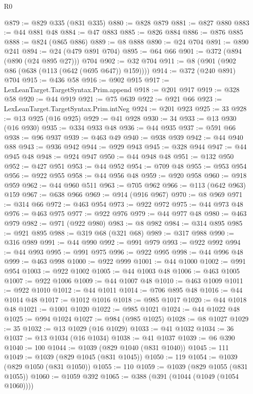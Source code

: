 \begin{lexlean}{R0}
\begin{coremodule}
@879 := @829 @335 (@831 @335)
@880 := @828 @879
@881 := @827 @880
@883 := @44 @881 @48
@884 := @47 @883
@885 := @826 @884
@886 := @876 @885
@888 := @824 (@865 @886)
@889 := @8 @888
@890 := @24 @704
@891 := @890 @241
@894 := @24 (@479 @891 @704)
@895 := @64 @66
@901 := @372 (@894 (@890 (@24 @895 @27))) @704
@902 := @32 @704
@911 := @8 (@901 (@902 @86 (@638 (@113 (@642 (@695 @647)) @159))))
@914 := @372 (@240 @891) @704
@915 := @436 @58
@916 := @902 @915
@917 := LexLeanTarget.TargetSyntax.Prim.append
@918 := @201 @917
@919 := @328 @58
@920 := @44 @919
@921 := @75 @639
@922 := @921 @66
@923 := LexLeanTarget.TargetSyntax.Prim.intNeg
@924 := @201 @923
@925 := 33
@928 := @13 @925 (@16 @925)
@929 := @41 @928
@930 := 34
@933 := @13 @930 (@16 @930)
@935 := @334 @933 @48
@936 := @44 @935
@937 := @591 @66
@938 := @96 @937
@939 := @463 @49
@940 := @938 @939
@942 := @44 @940 @88
@943 := @936 @942
@944 := @929 @943
@945 := @328 @944
@947 := @44 @945 @48
@948 := @924 @947
@950 := @44 @948 @48
@951 := @132 @950
@952 := @427 @951
@953 := @44 @952
@954 := @709 @48
@955 := @953 @954
@956 := @922 @955
@958 := @44 @956 @48
@959 := @920 @958
@960 := @918 @959
@962 := @44 @960 @511
@963 := @705 @962
@966 := @113 (@642 @963) @159
@967 := @638 @966
@969 := @914 (@916 @967)
@970 := @8 @969
@971 := @314 @66
@972 := @463 @954
@973 := @922 @972
@975 := @44 @973 @48
@976 := @463 @975
@977 := @922 @976
@979 := @44 @977 @48
@980 := @463 @979
@982 := @971 (@922 @980)
@983 := @8 @982
@984 := @314 @895
@985 := @921 @895
@988 := @319 @68 (@321 @68)
@989 := @317 @988
@990 := @316 @989
@991 := @44 @990
@992 := @991 @979
@993 := @922 @992
@994 := @44 @993
@995 := @991 @975
@996 := @922 @995
@998 := @44 @996 @48
@999 := @463 @998
@1000 := @922 @999
@1001 := @44 @1000
@1002 := @991 @954
@1003 := @922 @1002
@1005 := @44 @1003 @48
@1006 := @463 @1005
@1007 := @922 @1006
@1009 := @44 @1007 @48
@1010 := @463 @1009
@1011 := @922 @1010
@1012 := @44 @1011
@1014 := @706 @895 @48
@1016 := @44 @1014 @48
@1017 := @1012 @1016
@1018 := @985 @1017
@1020 := @44 @1018 @48
@1021 := @1001 @1020
@1022 := @985 @1021
@1024 := @44 @1022 @48
@1025 := @994 @1024
@1027 := @984 (@985 @1025)
@1028 := @8 @1027
@1029 := 35
@1032 := @13 @1029 (@16 @1029)
@1033 := @41 @1032
@1034 := 36
@1037 := @13 @1034 (@16 @1034)
@1038 := @41 @1037
@1039 := @6 @390
@1040 := 100
@1044 := @1039 (@829 @1040 (@831 @1040))
@1045 := 111
@1049 := @1039 (@829 @1045 (@831 @1045))
@1050 := 119
@1054 := @1039 (@829 @1050 (@831 @1050))
@1055 := 110
@1059 := @1039 (@829 @1055 (@831 @1055))
@1060 := @1059 @392
@1065 := @388 (@391 (@1044 (@1049 (@1054 @1060))))

\end{coremodule}
\end{lexlean}
